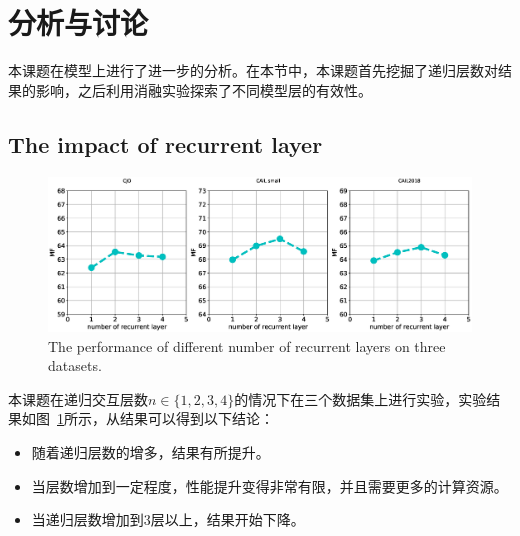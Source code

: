 \section{分析与讨论}
\label{sec:ran_analysis}
本课题在模型上进行了进一步的分析。在本节中，本课题首先挖掘了递归层数对结果的影响，之后利用消融实验探索了不同模型层的有效性。
\subsection{The impact of recurrent layer}
\begin{figure}
    \centering
    \includegraphics[scale=0.37, clip=true]{./sources/3_recurrent_layers2.eps}
    \vspace{-10pt}
    \caption{\label{fig:n_layers} The performance of different number of recurrent layers on three datasets. }
    \vspace{-5pt}
\end{figure}

本课题在递归交互层数$n \in \{1,2,3,4\}$的情况下在三个数据集上进行实验，实验结果如图~\ref{fig:n_layers}所示，从结果可以得到以下结论：

\begin{itemize}
    \item 随着递归层数的增多，结果有所提升。
    \item 当层数增加到一定程度，性能提升变得非常有限，并且需要更多的计算资源。
    \item 当递归层数增加到3层以上，结果开始下降。
\end{itemize}



